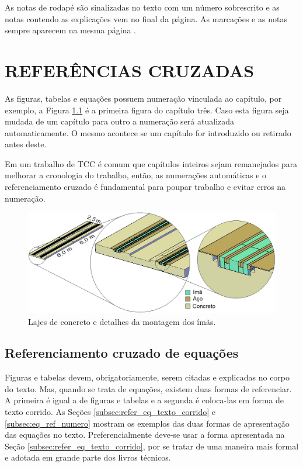 \documentclass[
        oneside,      %
        english,			
        brazil			 
        ]{configcefetmglpd}
\begin{document}
As notas de rodapé são sinalizadas no texto com um número sobrescrito e as notas contendo as explicações vem no final da página. As marcações e as notas sempre aparecem na mesma página .

\chapter{REFERÊNCIAS CRUZADAS} \label{cap:ref_cruzadas}
As figuras, tabelas e equações possuem numeração vinculada ao capítulo, por exemplo, a Figura \ref{fig:lajes_concreto} é a primeira figura do capítulo três. Caso esta figura seja mudada de um capítulo para outro a numeração será atualizada automaticamente. O mesmo acontece se um capítulo for introduzido ou retirado antes deste.

Em um trabalho de TCC é comum que capítulos inteiros sejam remanejados para melhorar a cronologia do trabalho, então, as numerações automáticas e o referenciamento cruzado é fundamental para poupar trabalho e evitar erros na numeração.

\begin{figure}[h]
	\larguratexto{12cm}  %
	\caption{Lajes de concreto e detalhes da montagem dos ímãs.}
	\label{fig:lajes_concreto}
	\begin{center}
		\includegraphics[width=12cm]{cap4_1.jpg}
	\end{center}
\end{figure}

\section{Referenciamento cruzado de equações}
Figuras e tabelas devem, obrigatoriamente, serem citadas e explicadas no corpo do texto. Mas, quando se trata de equações, existem duas formas de referenciar. A primeira é igual a de figuras e tabelas e a segunda é coloca-las em forma de texto corrido. As Seções \ref{subsec:refer_eq_texto_corrido} e \ref{subsec:eq_ref_numero} mostram os exemplos das duas formas de apresentação das equações no texto. Preferencialmente deve-se usar a forma apresentada na Seção \ref{subsec:refer_eq_texto_corrido}, por se tratar de uma maneira mais formal e adotada em grande parte dos livros técnicos.
\end{document}
